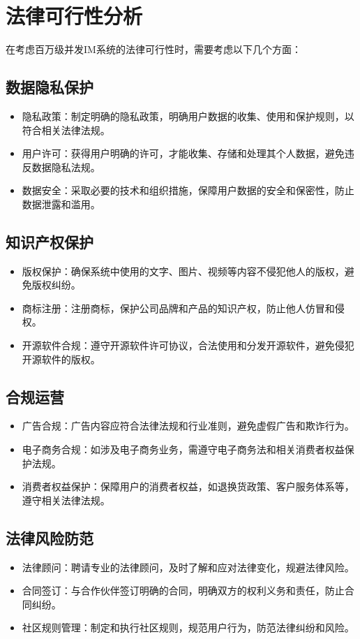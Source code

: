\documentclass[12pt]{article}
\begin{document}
\section{法律可行性分析}
在考虑百万级并发IM系统的法律可行性时，需要考虑以下几个方面：

\subsection{数据隐私保护}
\begin{itemize}
	\item 隐私政策：制定明确的隐私政策，明确用户数据的收集、使用和保护规则，以符合相关法律法规。
	\item 用户许可：获得用户明确的许可，才能收集、存储和处理其个人数据，避免违反数据隐私法规。
	\item 数据安全：采取必要的技术和组织措施，保障用户数据的安全和保密性，防止数据泄露和滥用。
\end{itemize}

\subsection{知识产权保护}
\begin{itemize}
	\item 版权保护：确保系统中使用的文字、图片、视频等内容不侵犯他人的版权，避免版权纠纷。
	\item 商标注册：注册商标，保护公司品牌和产品的知识产权，防止他人仿冒和侵权。
	\item 开源软件合规：遵守开源软件许可协议，合法使用和分发开源软件，避免侵犯开源软件的版权。
\end{itemize}

\subsection{合规运营}
\begin{itemize}
	\item 广告合规：广告内容应符合法律法规和行业准则，避免虚假广告和欺诈行为。
	\item 电子商务合规：如涉及电子商务业务，需遵守电子商务法和相关消费者权益保护法规。
	\item 消费者权益保护：保障用户的消费者权益，如退换货政策、客户服务体系等，遵守相关法律法规。
\end{itemize}

\subsection{法律风险防范}
\begin{itemize}
	\item 法律顾问：聘请专业的法律顾问，及时了解和应对法律变化，规避法律风险。
	\item 合同签订：与合作伙伴签订明确的合同，明确双方的权利义务和责任，防止合同纠纷。
	\item 社区规则管理：制定和执行社区规则，规范用户行为，防范法律纠纷和风险。
\end{itemize}
\end{document}
